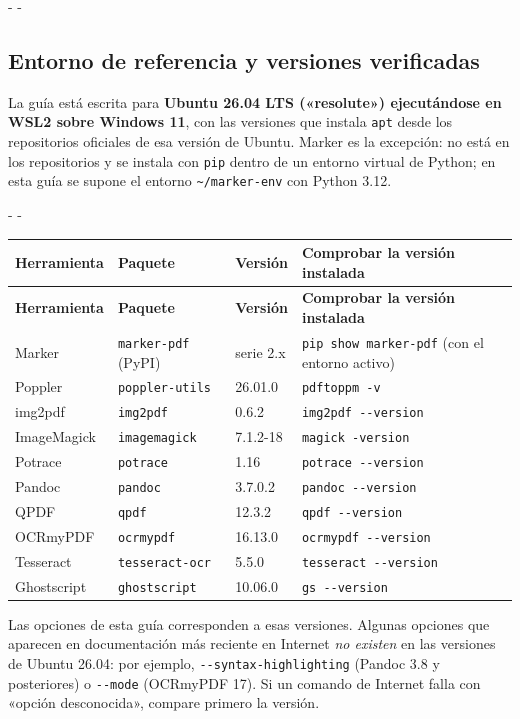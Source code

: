 \documentclass[11pt,a4paper]{article}
\makeatletter
\newcommand{\necesitaespacio}[1]{\par\penalty-100\begingroup
	\setlength{\dimen@}{#1}\dimen@ii\pagegoal\advance\dimen@ii-\pagetotal
	\ifdim\dimen@>\dimen@ii\ifdim\dimen@ii>\z@\vfil\fi\penalty-\@M\fi\endgroup}
\newcommand{\cmd}[1]{\texttt{\textcolor{colcmd}{#1}}}      %
\newcommand{\opt}[1]{\texttt{\textcolor{colopt}{#1}}}      %
\newcommand{\arch}[1]{\texttt{\textcolor{colarch}{#1}}}    %
\newcommand{\cab}[1]{\textbf{#1}}
\newcommand{\tl}{\textasciitilde{}}  %
\makeatother
\begin{document}
	\necesitaespacio{22\baselineskip}
	\subsection{Entorno de referencia y versiones verificadas}\label{sec:versiones}
	
	La guía está escrita para \textbf{Ubuntu 26.04 LTS («resolute») ejecutándose en WSL2 sobre Windows 11}, con las versiones que instala \cmd{apt} desde los repositorios oficiales de esa versión de Ubuntu. Marker es la excepción: no está en los repositorios y se instala con \cmd{pip} dentro de un entorno virtual de Python; en esta guía se supone el entorno \arch{\tl/marker-env} con Python 3.12.
	
	\begingroup\small
	\necesitaespacio{18\baselineskip}
	\begin{longtable}{L{2.5cm}L{4.0cm}L{2.4cm}L{5.16cm}}
		\toprule{}\cab{Herramienta} & \cab{Paquete} & \cab{Versión} & \cab{Comprobar la versión instalada}\\\midrule
		\endfirsthead
		\toprule{}\cab{Herramienta} & \cab{Paquete} & \cab{Versión} & \cab{Comprobar la versión instalada}\\\midrule
		\endhead
		\bottomrule
		\endfoot
		Marker & \texttt{marker-pdf} (PyPI) & serie 2.x & \cmd{pip show marker-\allowbreak{}pdf} (con el entorno activo)\\*
		Poppler & \texttt{poppler-utils} & 26.01.0 & \cmd{pdftoppm -v}\\
		img2pdf & \texttt{img2pdf} & 0.6.2 & \cmd{img2pdf -{}-version}\\
		ImageMagick & \texttt{imagemagick} & 7.1.2-18 & \cmd{magick -version}\\
		Potrace & \texttt{potrace} & 1.16 & \cmd{potrace -{}-version}\\
		Pandoc & \texttt{pandoc} & 3.7.0.2 & \cmd{pandoc -{}-version}\\
		QPDF & \texttt{qpdf} & 12.3.2 & \cmd{qpdf -{}-version}\\
		OCRmyPDF & \texttt{ocrmypdf} & 16.13.0 & \cmd{ocrmypdf -{}-version}\\
		Tesseract & \texttt{tesseract-ocr} & 5.5.0 & \cmd{tesseract -{}-version}\\*
		Ghostscript & \texttt{ghostscript} & 10.06.0 & \cmd{gs -{}-version}\\
	\end{longtable}
	\endgroup
	
	\begin{importante}[Versiones]
		Las opciones de esta guía corresponden a esas versiones. Algunas opciones que aparecen en documentación más reciente en Internet \emph{no existen} en las versiones de Ubuntu 26.04: por ejemplo, \opt{-{}-syntax-\allowbreak{}highlighting} (Pandoc 3.8 y posteriores) o \opt{-{}-mode} (OCRmyPDF 17). Si un comando de Internet falla con «opción desconocida», compare primero la versión.
	\end{importante}
	
\end{document}
